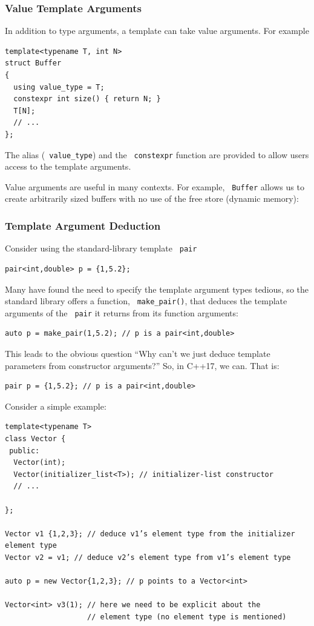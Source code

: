 \documentclass[11pt]{article}
\let\OldTexttt\texttt
\renewcommand{\texttt}[1]{\OldTexttt{\color{MidnightBlue} #1}}
\begin{document}
\subsubsection{Value Template Arguments}
\label{sec:org255b19a}
In addition to type arguments, a template can take value arguments. For example
\begin{verbatim}
template<typename T, int N>
struct Buffer
{
  using value_type = T;
  constexpr int size() { return N; }
  T[N];
  // ...
};
\end{verbatim}
The alias (\texttt{value\_type}) and the \texttt{constexpr} function are provided to allow users access to the
template arguments.

Value arguments are useful in many contexts. For example, \texttt{Buffer} allows us to create arbitrarily
sized buffers with no use of the free store (dynamic memory):
\subsubsection{Template Argument Deduction}
\label{sec:orge51fe7e}
Consider using the standard-library template \texttt{pair}
\begin{verbatim}
pair<int,double> p = {1,5.2};
\end{verbatim}

Many have found the need to specify the template argument types tedious, so the standard library
offers a function, \texttt{make\_pair()}, that deduces the template arguments of the \texttt{pair} it returns from
its function arguments:
\begin{verbatim}
auto p = make_pair(1,5.2); // p is a pair<int,double>
\end{verbatim}
This leads to the obvious question ``Why can’t we just deduce template parameters from
constructor arguments?'' So, in C++17, we can. That is:
\begin{verbatim}
pair p = {1,5.2}; // p is a pair<int,double>
\end{verbatim}

Consider a simple example:
\begin{verbatim}
template<typename T>
class Vector {
 public:
  Vector(int);
  Vector(initializer_list<T>); // initializer-list constructor
  // ...
  
};

Vector v1 {1,2,3}; // deduce v1’s element type from the initializer element type
Vector v2 = v1; // deduce v2’s element type from v1’s element type

auto p = new Vector{1,2,3}; // p points to a Vector<int>

Vector<int> v3(1); // here we need to be explicit about the
                   // element type (no element type is mentioned)
\end{verbatim}
\end{document}
